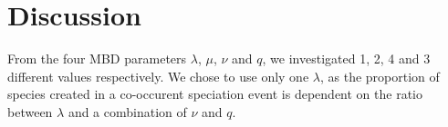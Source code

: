 \section{Discussion}

From the four MBD parameters $\lambda$, $\mu$, $\nu$ and $q$,
we investigated 1, 2, 4 and 3 different values respectively.
We chose to use only one $\lambda$, as the proportion of species
created in a co-occurent speciation event is dependent on the ratio
between $\lambda$ and a combination of $\nu$ and $q$.  
